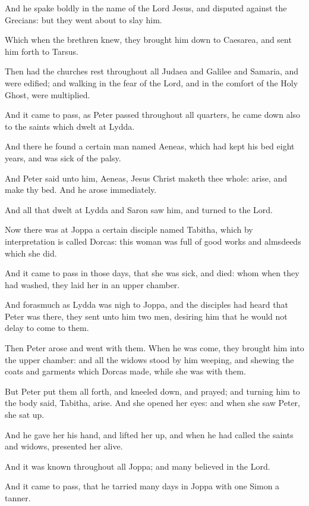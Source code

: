 \Verse And he spake boldly in the name of the Lord Jesus, and disputed against the Grecians: but they went about to slay him.

\Verse Which when the brethren knew, they brought him down to Caesarea, and sent him forth to Tarsus.

\Verse Then had the churches rest throughout all Judaea and Galilee and Samaria, and were edified; and walking in the fear of the Lord, and in the comfort of the Holy Ghost, were multiplied.

\Verse And it came to pass, as Peter passed throughout all quarters, he came down also to the saints which dwelt at Lydda.

\Verse And there he found a certain man named Aeneas, which had kept his bed eight years, and was sick of the palsy.

\Verse And Peter said unto him, Aeneas, Jesus Christ maketh thee whole: arise, and make thy bed. And he arose immediately.

\Verse And all that dwelt at Lydda and Saron saw him, and turned to the Lord.

\Verse Now there was at Joppa a certain disciple named Tabitha, which by interpretation is called Dorcas: this woman was full of good works and almsdeeds which she did.

\Verse And it came to pass in those days, that she was sick, and died: whom when they had washed, they laid her in an upper chamber.

\Verse And forasmuch as Lydda was nigh to Joppa, and the disciples had heard that Peter was there, they sent unto him two men, desiring him that he would not delay to come to them.

\Verse Then Peter arose and went with them. When he was come, they brought him into the upper chamber: and all the widows stood by him weeping, and shewing the coats and garments which Dorcas made, while she was with them.

\Verse But Peter put them all forth, and kneeled down, and prayed; and turning him to the body said, Tabitha, arise. And she opened her eyes: and when she saw Peter, she sat up.

\Verse And he gave her his hand, and lifted her up, and when he had called the saints and widows, presented her alive.

\Verse And it was known throughout all Joppa; and many believed in the Lord.

\Verse And it came to pass, that he tarried many days in Joppa with one Simon a tanner.


